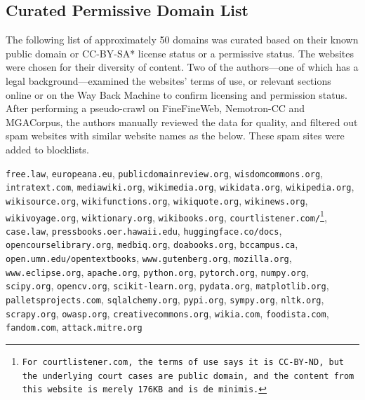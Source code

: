 \subsection{Curated Permissive Domain List}
\label{app:permissive_domains}
The following list of approximately 50 domains was curated based on their known public domain or CC-BY-SA* license status or a permissive status. The websites were chosen for their diversity of content.  Two of the authors---one of which has a legal background---examined the websites' terms of use, or relevant sections online or on the Way Back Machine to confirm licensing and permission status.  After performing a pseudo-crawl on FineFineWeb, Nemotron-CC and MGACorpus, the authors manually reviewed the data for quality, and filtered out spam websites with similar website names as the below. These spam sites  were added to blocklists. 
{\footnotesize

     \texttt{free.law}, \texttt{europeana.eu},
    \texttt{publicdomainreview.org},
    \texttt{wisdomcommons.org},
    \texttt{intratext.com},
    \texttt{mediawiki.org},
    \texttt{wikimedia.org},
    \texttt{wikidata.org},
    \texttt{wikipedia.org},
    \texttt{wikisource.org},
    \texttt{wikifunctions.org},
    \texttt{wikiquote.org},
    \texttt{wikinews.org},
    \texttt{wikivoyage.org},
    \texttt{wiktionary.org},
    \texttt{wikibooks.org},
    \texttt{courtlistener.com/\footnote{For \texttt{courtlistener.com}, the terms of use says it is CC-BY-ND, but the underlying court cases are public domain, and the content from this website is merely 176KB and is de minimis.}},
    \texttt{case.law},
    \texttt{pressbooks.oer.hawaii.edu},
    \texttt{huggingface.co/docs},
    \texttt{opencourselibrary.org},
    \texttt{medbiq.org},
    \texttt{doabooks.org},
    \texttt{bccampus.ca},
    \texttt{open.umn.edu/opentextbooks},
    \texttt{www.gutenberg.org},
    \texttt{mozilla.org},
    \texttt{www.eclipse.org},
    \texttt{apache.org},
    \texttt{python.org},
    \texttt{pytorch.org},
    \texttt{numpy.org},
    \texttt{scipy.org},
    \texttt{opencv.org},
    \texttt{scikit-learn.org},
    \texttt{pydata.org},
    \texttt{matplotlib.org},
    \texttt{palletsprojects.com},
    \texttt{sqlalchemy.org},
    \texttt{pypi.org},
    \texttt{sympy.org},
    \texttt{nltk.org},
    \texttt{scrapy.org},
    \texttt{owasp.org},
    \texttt{creativecommons.org},
    \texttt{wikia.com},
    \texttt{foodista.com},
    \texttt{fandom.com},
    \texttt{attack.mitre.org}

}


